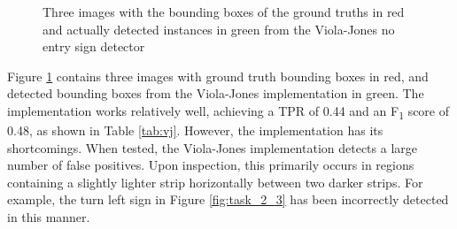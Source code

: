 \documentclass[twocolumn, 10pt, a4paper]{article}
\begin{document}
\begin{figure}[htbp]
  \centering
  \hfill
  \hfill
  \caption{Three images with the bounding boxes of the ground truths in red and actually detected instances in green from the Viola-Jones no entry sign detector}\label{fig:task_2}
\end{figure}

Figure \ref{fig:task_2} contains three images with ground truth bounding boxes in red, and detected bounding boxes from the Viola-Jones implementation in green.
The implementation works relatively well, achieving a TPR of 0.44 and an F\textsubscript{1} score of 0.48, as shown in Table \ref{tab:vj}.
However, the implementation has its shortcomings.
When tested, the Viola-Jones implementation detects a large number of false positives.
Upon inspection, this primarily occurs in regions containing a slightly lighter strip horizontally between two darker strips.
For example, the turn left sign in Figure \ref{fig:task_2_3} has been incorrectly detected in this manner.
\end{document}
